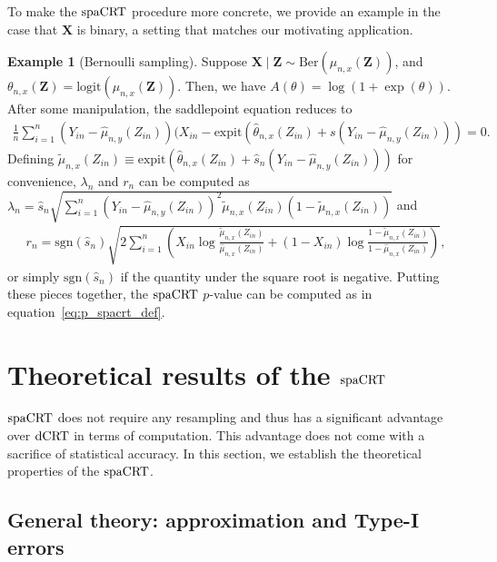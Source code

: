 \documentclass[12pt]{article}
\theoremstyle{definition}
\newtheorem{example}{Example}
\newcommand{\prx}{\bm X}								%
\newcommand{\srx}{X}									%
\newcommand{\prz}{\bm Z}								%
\newcommand{\srz}{Z}									%
\newcommand{\sry}{Y}									%
\newcommand{\dCRT}{\textnormal{dCRT}} 					%
\newcommand{\spacrt}{\textnormal{spaCRT}}               %
\begin{document}
  To make the $\spacrt$ procedure more concrete, we provide an example in the case that $\prx$ is binary, a setting that matches our motivating application.
  
  \begin{example}[Bernoulli sampling]
	Suppose $\prx\mid\prz\sim \mathrm{Ber}(\mu_{n,x}(\prz))$, and $\theta_{n,x}(\prz) = \text{logit}(\mu_{n,x}(\prz))$. Then, we have $A(\theta) = \log(1 + \exp(\theta))$. After some manipulation, the saddlepoint equation reduces to 
	  \begin{align*}
		  \frac{1}{n}\sum_{i=1}^n (\sry_{in}-\widehat{\mu}_{n,y}(\srz_{in}))(\srx_{in}-\text{expit}(\widehat \theta_{n,x}(\srz_{in})+s(\sry_{in}-\widehat{\mu}_{n,y}(\srz_{in})))=0.
	  \end{align*}
	  Defining $\widetilde \mu_{n,x}(Z_{in}) \equiv \text{expit}(\widehat \theta_{n,x}(\srz_{in})+\hat s_n(\sry_{in}-\widehat{\mu}_{n,y}(\srz_{in})))$ for convenience, $\lambda_n$ and $r_n$ can be computed as $\lambda_n=\hat s_n \sqrt{\sum_{i=1}^n (\sry_{in}-\widehat{\mu}_{n,y}(\srz_{in}))^2\widetilde \mu_{n,x}(Z_{in})(1-\widetilde \mu_{n,x}(Z_{in}))}$ and
	  \begin{align*}
		  r_n=\mathrm{sgn}(\hat s_n)\sqrt{2\sum_{i=1}^n \left(X_{in} \log \frac{\widetilde \mu_{n,x}(Z_{in})}{\widehat \mu_{n,x}(Z_{in})} + (1 - X_{in})\log \frac{1 - \widetilde \mu_{n,x}(Z_{in})}{1 - \widehat \mu_{n,x}(Z_{in})}\right)},
	  \end{align*}
	or simply $\text{sgn}(\hat s_n)$ if the quantity under the square root is negative. Putting these pieces together, the $\spacrt$ $p$-value can be computed as in equation~\eqref{eq:p_spacrt_def}.	
  \end{example}
  
  \section{Theoretical results of the $\spacrt$}\label{sec:general_results}
  
  $\spacrt$ does not require any resampling and thus has a significant advantage over $\dCRT$ in terms of computation. This advantage does not come with a sacrifice of statistical accuracy. In this section, we establish the theoretical properties of the $\spacrt$.
  
  \subsection{General theory: approximation and Type-I errors}
  
\end{document}
